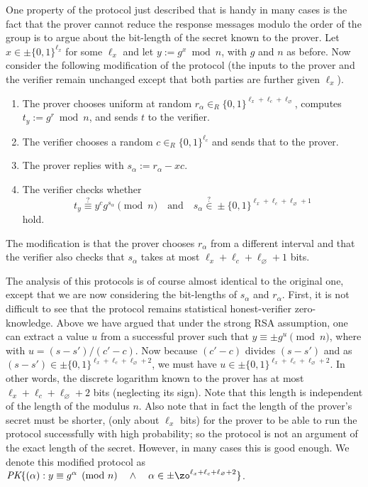 One property of  the protocol just described that is handy in many cases is 
the fact that the prover cannot reduce the response messages modulo the 
order of the group is to argue about the bit-length of the secret known to the prover.
Let $x \in \pm \{0,1\}^{\ell_x}$ for some $\ell_x$ and let $y := g^x \bmod{n}$, with 
$g$ and $n$ as before.
Now consider the following modification of the protocol 
(the inputs to the prover and the verifier
remain unchanged except that both parties are further given $\ell_x$).
\begin{enumerate}
\item The prover chooses uniform at random $r_\alpha  \in_R \{0,1\}^{\ell_x+\ell_c + \ell_\varnothing}$,
computes $t_y := g^r \bmod{n}$, and sends $t$ to the verifier.
\item The verifier chooses a random $c \in_R \{0,1\}^{\ell_c}$ and sends that to the 
prover.
\item The prover replies with $s_\alpha := r_\alpha - xc$.
\item The verifier checks whether 
\[
t_y \stackrel{?}{\equiv} y^c g^{s_\alpha} \pmod{n}
\quad\text{and}\quad
s_\alpha \stackrel{?}{\in} \pm \{0,1\}^{\ell_x+\ell_c + \ell_\varnothing+1}
\]
hold.
\end{enumerate}
The modification is that the prover chooses $r_\alpha$ from a different interval
and that the verifier also checks that $s_\alpha$ takes at most 
${\ell_x+\ell_c + \ell_\varnothing+1}$ bits.

The analysis of this protocols is of course almost identical to the original one, except
that we are now considering the bit-lengths of $s_\alpha$ and $r_\alpha$.
First, it is not difficult to see that the protocol remains statistical 
honest-verifier zero-knowledge.
Above we have argued that under the strong RSA assumption, one can extract
a value $u$ from a successful prover such that 
$y \equiv \pm g^u \pmod{n}$,
where with $u = (s-s')/(c'-c)$. 
Now because  $(c'-c)$ divides $(s-s')$ and as 
$(s-s') \in \pm\{0,1\}^{\ell_x+\ell_c + \ell_\varnothing+2}$,
we must have
$u \in \pm\{0,1\}^{\ell_x+\ell_c + \ell_\varnothing+2}$.
In other words, the discrete logarithm known to the prover has at most 
$\ell_x+\ell_c + \ell_\varnothing+2$ bits (neglecting its sign). 
Note that this length is independent of the length of the modulus $n$.
Also note that in fact the length of the prover's secret must be shorter, 
(only about $\ell_x$ bits) for the prover to be able to run
the protocol successfully with high probability; so the protocol is not an argument of the
exact length of the secret.
However, in many cases this is good enough. 
We denote this modified protocol as 
$\textit{PK}\{(\alpha): y \equiv g^\alpha \pmod{n}  \quad \wedge \quad 
\alpha \in  \pm\zo^{\ell_x+\ell_c + \ell_\varnothing+2}\}$.

